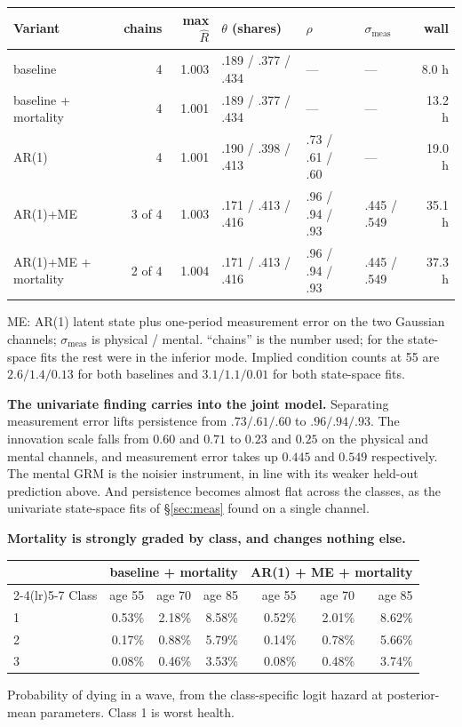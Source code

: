 \documentclass[11pt]{article}
\begin{document}
\begin{center}\small
\begin{tabular}{lrrlllr}
\toprule
Variant & chains & max $\hat R$ & $\theta$ (shares) & $\rho$ &
$\sigma_{\text{meas}}$ & wall \\
\midrule
baseline & 4 & 1.003 & .189 / .377 / .434 & --- & --- & 8.0 h \\
baseline + mortality & 4 & 1.001 & .189 / .377 / .434 & --- & --- & 13.2 h \\
AR(1) & 4 & 1.001 & .190 / .398 / .413 & .73 / .61 / .60 & --- & 19.0 h \\
AR(1)+ME & 3 of 4 & 1.003 & .171 / .413 / .416 & .96 / .94 / .93 & .445 / .549 & 35.1 h \\
AR(1)+ME + mortality & 2 of 4 & 1.004 & .171 / .413 / .416 & .96 / .94 / .93 & .445 / .549 & 37.3 h \\
\bottomrule
\end{tabular}

{\scriptsize ME: AR(1) latent state plus one-period measurement error on the
two Gaussian channels; $\sigma_{\text{meas}}$ is physical / mental.
``chains'' is the number used; for the state-space fits
the rest were in the inferior mode. Implied condition counts at 55 are
$2.6 / 1.4 / 0.13$ for both baselines and $3.1 / 1.1 / 0.01$ for both
state-space fits.}
\end{center}

\textbf{The univariate finding carries into the joint model.} Separating
measurement error lifts persistence from $.73 / .61 / .60$ to
$.96 / .94 / .93$. The innovation scale falls from $0.60$ and $0.71$ to $0.23$
and $0.25$ on the physical and mental channels, and measurement error takes up
$0.445$ and $0.549$ respectively. The mental GRM is the noisier instrument, in
line with its weaker held-out prediction above. And persistence becomes
almost flat across the classes, as the univariate state-space fits of
\S\ref{sec:meas} found on a single channel.

\textbf{Mortality is strongly graded by class, and changes nothing else.}

\begin{center}\small
\begin{tabular}{lrrrrrr}
\toprule
 & \multicolumn{3}{c}{baseline + mortality} & \multicolumn{3}{c}{AR(1) + ME + mortality} \\
\cmidrule(lr){2-4}\cmidrule(lr){5-7}
Class & age 55 & age 70 & age 85 & age 55 & age 70 & age 85 \\
\midrule
1 & 0.53\% & 2.18\% & 8.58\% & 0.52\% & 2.01\% & 8.62\% \\
2 & 0.17\% & 0.88\% & 5.79\% & 0.14\% & 0.78\% & 5.66\% \\
3 & 0.08\% & 0.46\% & 3.53\% & 0.08\% & 0.48\% & 3.74\% \\
\bottomrule
\end{tabular}

{\scriptsize Probability of dying in a wave, from the class-specific logit
hazard at posterior-mean parameters. Class 1 is worst health.}
\end{center}
\end{document}
